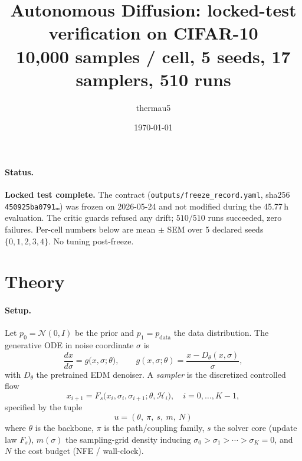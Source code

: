 \documentclass[11pt]{article}
\title{Autonomous Diffusion: locked-test verification on CIFAR-10\\
       {\large 10{,}000 samples / cell, 5 seeds, 17 samplers, 510 runs}}
\author{thermau5}
\date{\today}
\begin{document}
\maketitle

\paragraph{Status.} \textbf{Locked test complete.} The contract
(\texttt{outputs/freeze\_record.yaml}, sha256 \texttt{450925ba0791\ldots})
was frozen on 2026-05-24 and not modified during the 45.77\,h evaluation.
The critic guards refused any drift; \(510/510\) runs succeeded, zero
failures. Per-cell numbers below are mean \(\pm\) SEM over 5 declared
seeds \(\{0, 1, 2, 3, 4\}\). No tuning post-freeze.

\section{Theory}
\label{sec:theory}

\paragraph{Setup.} Let \(p_0=\mathcal N(0,I)\) be the prior and
\(p_1 = p_{\mathrm{data}}\) the data distribution. The generative ODE
in noise coordinate \(\sigma\) is
\[
\frac{dx}{d\sigma} = g\bigl(x,\sigma;\theta\bigr),
\qquad
g(x,\sigma;\theta) = \frac{x - D_\theta(x,\sigma)}{\sigma},
\]
with \(D_\theta\) the pretrained EDM denoiser. A \emph{sampler} is the discretized controlled flow
\[
x_{i+1} = F_s\bigl(x_i,\sigma_i,\sigma_{i+1};\theta,\mathcal H_i\bigr),
\quad i = 0,\ldots,K-1,
\]
specified by the tuple
\[
u = (\theta,\ \pi,\ s,\ m,\ N)
\]
where \(\theta\) is the backbone, \(\pi\) is the path/coupling family, \(s\)
the solver core (update law \(F_s\)), \(m(\sigma)\) the sampling-grid
density inducing \(\sigma_0>\sigma_1>\cdots>\sigma_K=0\), and \(N\)
the cost budget (NFE / wall-clock).
\end{document}
